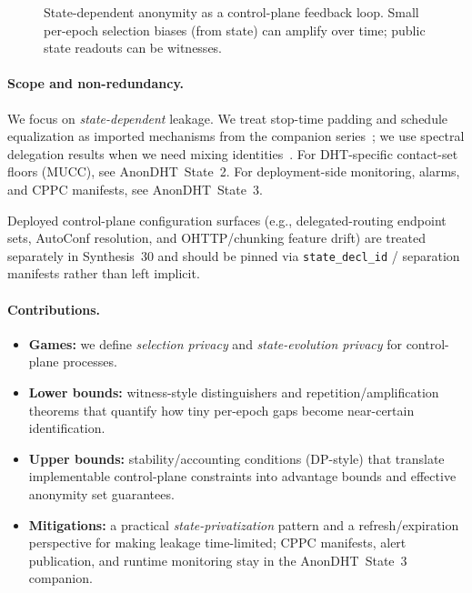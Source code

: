 \documentclass[11pt]{article}
\begin{document}
\begin{figure}[t]
  \centering
  \caption{State-dependent anonymity as a control-plane feedback loop.
  Small per-epoch selection biases (from state) can amplify over time; public state readouts can be witnesses.
  }
  \label{fig:control-plane-loop}
\end{figure}

\paragraph{Scope and non-redundancy.}
We focus on \emph{state-dependent} leakage.
We treat stop-time padding and schedule equalization as imported mechanisms from the companion series~\cite{series:stoptimeaddendum,series:schedcompiler};
we use spectral delegation results when we need mixing identities~\cite{series:spectral}.
For DHT-specific contact-set floors (MUCC), see AnonDHT~State~2.\cite{series:state2}
For deployment-side monitoring, alarms, and CPPC manifests, see AnonDHT~State~3.\cite{series:state3}

Deployed control-plane configuration surfaces (e.g., delegated-routing endpoint sets, AutoConf resolution, and OHTTP/chunking feature drift) are treated separately in Synthesis~30 and should be pinned via \texttt{state\_decl\_id} / separation manifests rather than left implicit.\cite{series:deployedsurfaces}

\paragraph{Contributions.}
\begin{itemize}[leftmargin=*]
\item \textbf{Games:} we define \emph{selection privacy} and \emph{state-evolution privacy} for control-plane processes.
\item \textbf{Lower bounds:} witness-style distinguishers and repetition/amplification theorems that quantify how tiny per-epoch gaps become near-certain identification.
\item \textbf{Upper bounds:} stability/accounting conditions (DP-style) that translate implementable control-plane constraints into advantage bounds and effective anonymity set guarantees.
\item \textbf{Mitigations:} a practical \emph{state-privatization} pattern and a refresh/expiration perspective for making leakage time-limited; CPPC manifests, alert publication, and runtime monitoring stay in the AnonDHT~State~3 companion.\cite{series:state3}
\end{itemize}
\end{document}
